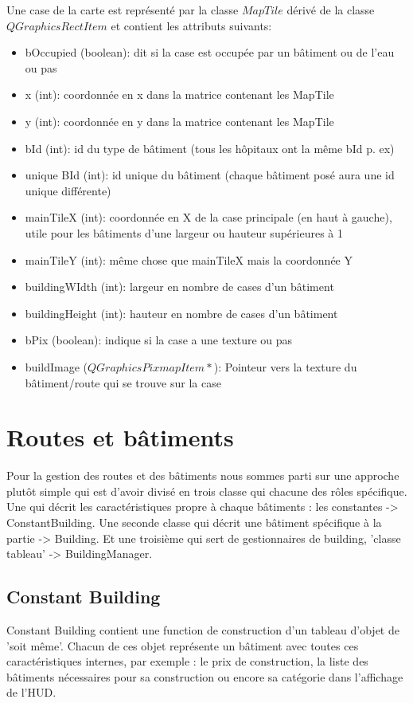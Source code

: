 \documentclass[a4paper,10pt,openany,oneside]{book}
\begin{document}
Une case de la carte est représenté par la classe $MapTile$ dérivé de la classe $QGraphicsRectItem$ et contient les attributs suivants:
\begin{itemize}
\item bOccupied (boolean): dit si la case est occupée par un bâtiment ou de l'eau ou pas
\item x (int): coordonnée en x dans la matrice contenant les MapTile
\item y (int): coordonnée en y dans la matrice contenant les MapTile
\item bId (int): id du type de bâtiment (tous les hôpitaux ont la même bId p. ex)
\item unique BId (int): id unique du bâtiment (chaque bâtiment posé aura une id unique différente)
\item mainTileX (int): coordonnée en X de la case principale (en haut à gauche), utile pour les bâtiments d'une largeur ou hauteur supérieures à 1
\item mainTileY (int): même chose que mainTileX mais la coordonnée Y
\item buildingWIdth (int): largeur en nombre de cases d'un bâtiment
\item buildingHeight (int): hauteur en nombre de cases d'un bâtiment
\item bPix (boolean): indique si la case a une texture ou pas
\item buildImage ($QGraphicsPixmapItem*$): Pointeur vers la texture du bâtiment/route qui se trouve sur la case
\end{itemize}
\section{Routes et bâtiments}
Pour la gestion des routes et des bâtiments nous sommes parti sur une approche plutôt simple qui est d'avoir divisé en trois classe qui chacune des rôles spécifique. Une qui décrit les caractéristiques propre à chaque bâtiments : les constantes -> ConstantBuilding. Une seconde classe qui décrit une bâtiment spécifique à la partie -> Building. Et une troisième qui sert de gestionnaires de building, 'classe tableau' -> BuildingManager. 

\subsection{Constant Building}
Constant Building contient une function de construction d'un tableau d'objet de 'soit même'. Chacun de ces objet représente un bâtiment avec toutes ces caractéristiques internes, par exemple : le prix de construction, la liste des bâtiments nécessaires pour sa construction ou encore sa catégorie dans l'affichage de l'HUD.
\end{document}
